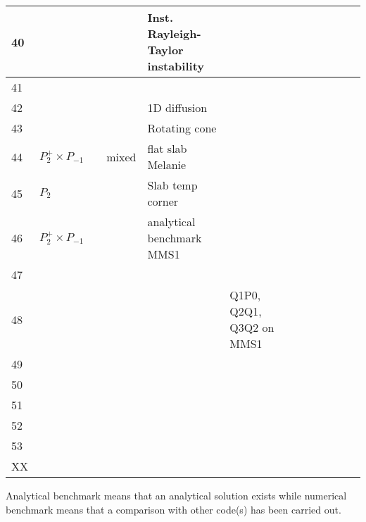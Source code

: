 \begin{landscape}
{\begin{tabular}{|p{0.4cm}||p{1.9cm}p{3.6cm}p{1.5cm}p{4.5cm}|p{0.2cm}|p{0.2cm}|p{0.2cm}|p{0.2cm}|p{0.2cm}|p{0.2cm}|p{0.2cm}|p{0.2cm}|}
\hline
40 & & & & Inst. Rayleigh-Taylor instability &&&&&&&& \\
\hline
41 & & & & & &&&&&&& \\
\hline
42 & & & &  1D diffusion &&&&&&&& \\
\hline
43 & & & & Rotating cone &&&&&&&& \\
\hline
44 & $P_2^+\times P_{-1}$ & & mixed  & flat slab Melanie & &&&&&&& \\
\hline
45 & $P_2$ & & & Slab temp corner \cite{vack08} & &&&&&&& \\
\hline
46 & $P_2^+\times P_{-1}$ & & & analytical benchmark MMS1 & & & & & & & & \\
\hline
47 &&&&&&&&&&&& \\
\hline
48 & & & & & Q1P0, Q2Q1, Q3Q2 on MMS1  &&&&&&& \\
\hline
49 &&&&&&&&&&&& \\
\hline
50 &&&&&&&&&&&& \\
\hline
51 &&&&&&&&&&&& \\
\hline
52 &&&&&&&&&&&& \\
\hline
53 &&&&&&&&&&&& \\
\hline
XX &&&&&&&&&&&& \\
\hline
\end{tabular}
}

Analytical benchmark means that an analytical solution exists while numerical benchmark
means that a comparison with other code(s) has been carried out.
\end{landscape}


